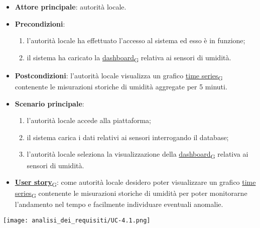 \begin{itemize}
	\item \textbf{Attore principale}: autorità locale.
	\item \textbf{Precondizioni}:
	      \begin{enumerate}
		      \item l'autorità locale ha effettuato l'accesso al sistema ed esso è in funzione;
		      \item il sistema ha caricato la \href{https://7last.github.io/docs/pb/documentazione-interna/glossario\#dashboard}{dashboard\textsubscript{G}} relativa ai sensori di umidità.
	      \end{enumerate}
	\item \textbf{Postcondizioni}: l'autorità locale visualizza un grafico \href{https://7last.github.io/docs/pb/documentazione-interna/glossario\#time-series}{time series\textsubscript{G}} contenente le misurazioni storiche di umidità aggregate per 5 minuti.
	\item \textbf{Scenario principale}:
	      \begin{enumerate}
		      \item l'autorità locale accede alla piattaforma;
		      \item il sistema carica i dati relativi ai sensori interrogando il database;
		      \item l'autorità locale seleziona la visualizzazione della \href{https://7last.github.io/docs/pb/documentazione-interna/glossario\#dashboard}{dashboard\textsubscript{G}} relativa ai sensori di umidità.
	      \end{enumerate}
	\item \href{https://7last.github.io/docs/pb/documentazione-interna/glossario\#user-story}{\textbf{User story}\textsubscript{G}}:
	      come autorità locale desidero poter visualizzare un grafico \href{https://7last.github.io/docs/pb/documentazione-interna/glossario\#time-series}{time series\textsubscript{G}} contenente le misurazioni storiche
	      di umidità per poter monitorarne l'andamento nel tempo e facilmente individuare eventuali anomalie.
\end{itemize}
\begin{center}
	\texttt{[image: analisi\_dei\_requisiti/UC-4.1.png]}
\end{center}


